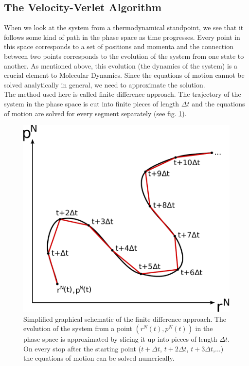 \documentclass[12pt]{article}
\begin{document}
\subsection{The Velocity-Verlet Algorithm}
When we look at the system from a thermodynamical standpoint, we see that it follows some kind of path in the phase space as time progresses. Every
point in this space corresponds to a set of positions and momenta and the connection between two points corresponds to the evolution of the system
from one state to another. As mentioned above, this evolution (the dynamics of the system) is a crucial element to Molecular Dynamics. Since the
equations of motion cannot be solved analytically in general, we need to approximate the solution.\\
The method used here is called finite difference approach. The trajectory of the system in the phase space is cut into finite pieces of length $\Delta
t$ and the equations of motion are solved for every segment separately (see fig. \ref{fig:finitedifference}).\\
\begin{figure}
    \begin{center}
        \includegraphics[scale=0.5]{images/finite_approach.pdf}
        \caption{Simplified graphical schematic of the finite difference approach. The evolution of the system from a point $(r^N(t),p^N(t))$ in the
            phase space is approximated by slicing it up into pieces of length $\Delta t$. On every stop after the starting point ($t+\Delta t$, 
            $t+2\Delta t$, $t+3\Delta t$,$\ldots$) the equations of motion can be solved numerically.}
        \label{fig:finitedifference} 
    \end{center}
\end{figure}
\end{document}
